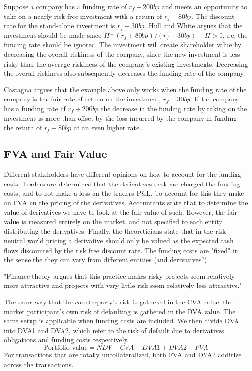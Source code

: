 \documentclass[10pt,a4paper]{article}
\begin{document}
        Suppose a company has a funding rate of $r_{f} + 200bp$ and meets an opportunity to take on a nearly risk-free investment with a return of $r_{f} + 80bp$. The discount rate for the stand-alone investment is $r_{f} + 30bp$. Hull and White argues that the investment should be made since $H*(r_{f} + 80bp) / (r_{f} + 30bp) - H > 0$, i.e. the funding rate should be ignored. The investment will create shareholder value by decreasing the overall riskiness of the company, since the new investment is less risky than the average riskiness of the company's existing investments. Decreasing the overall riskiness also subsequently decreases the funding rate of the company. 

        Castagna argues that the example above only works when the funding rate of the company is the fair rate of return on the investment, $r_{f} + 30bp$. If the company has a funding rate of $r_{f} + 200bp$ the decrease in the funding rate by taking on the investment is more than offset by the loss incurred by the company in funding the return of $r_{f} + 80bp$ at an even higher rate.
    
    \subsection{FVA and Fair Value}
        Different stakeholders have different opinions on how to account for the funding costs. Traders are determined that the derivatives desk are charged the funding costs, and to not make a loss on the traders P\&L. To account for this they make an FVA on the pricing of the derivatives. Accountants state that to determine the value of derivatives we have to look at the fair value of such. However, the fair value is measured entirely on the market, and not specified to each entity distributing the derivatives. Finally, the theoreticians state that in the risk-neutral world pricing a derivative should only be valued as the expected cash flows discounted by the risk free discount rate. The funding costs are "fixed" in the sense the they can vary from different entities (and derivatives?).

        "Finance theory argues that this practice makes risky projects seem relatively more attractive and projects with very little risk seem relatively less attractive."

        The same way that the counterparty's risk is gathered in the CVA value, the market participant's own risk of defaulting is gathered in the DVA value. The same setup is applicable when funding costs are included. We then divide DVA into DVA1 and DVA2, which refer to the risk of default due to derivatives obligations and funding costs respectively.
        \begin{equation}
            \text{Portfolio value} = NDV - CVA + DVA1 + DVA2 - FVA
        \end{equation}
        For transactions that are totally uncollateralized, both FVA and DVA2 additive across the transactions.
\end{document}
